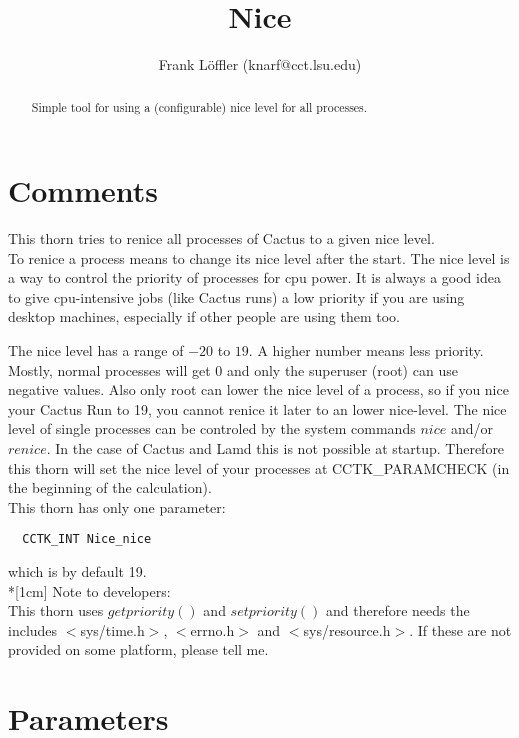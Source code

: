 \documentclass{article}
\begin{document}
\title{Nice}
\author{Frank L\"offler (knarf@cct.lsu.edu)}

\maketitle


\begin{abstract}
Simple tool for using a (configurable) nice level for all processes.
\end{abstract}

\section{Comments}

This thorn tries to renice all processes of Cactus to a given nice level.\\
To renice a process means to change its nice level after the start. The nice
level is a way to control the priority of processes for cpu power. It is
always a good idea to give cpu-intensive jobs (like Cactus runs) a low
priority if you are using desktop machines, especially if other people are
using them too.

The nice level has a range of $-20$ to $19$. A higher number means less
priority. Mostly, normal processes will get $0$ and only the superuser
(root) can use negative values. Also only root can lower the nice level
of a process, so if you nice your Cactus Run to 19, you cannot renice it
later to an lower nice-level. The nice level of single
processes can be controled by the system commands $nice$ and/or $renice$.
In the case of Cactus and Lamd this is not possible at startup. Therefore
this thorn will set the nice level of your processes at CCTK\_PARAMCHECK
(in the beginning of the calculation).\\
This thorn has only one parameter:
\begin{verbatim}
  CCTK_INT Nice_nice
\end{verbatim}
which is by default 19.\\*[1cm]
Note to developers:\\
This thorn uses $getpriority()$ and $setpriority()$ and therefore needs
the includes $<$sys/time.h$>$, $<$errno.h$>$ and $<$sys/resource.h$>$.
If these are not provided on some platform, please tell me.



\section{Parameters} 
\end{document}
